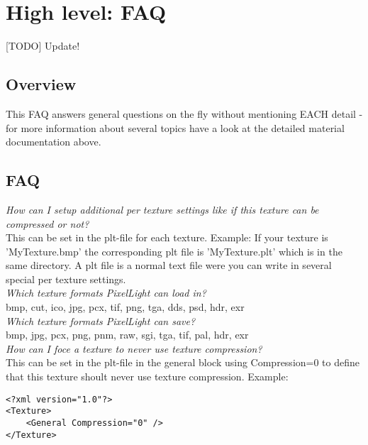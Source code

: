 \chapter{High level: FAQ}


[TODO] Update!



\section{Overview}
This FAQ answers general questions on the fly without mentioning EACH detail - for more information
about several topics have a look at the detailed material documentation above.\\




\section{FAQ}


\emph{How can I setup additional per texture settings like if this texture can be compressed or not?}\\
This can be set in the plt-file for each texture. Example: If your texture is 'MyTexture.bmp' the
corresponding plt file is 'MyTexture.plt' which is in the same directory. A plt file is a normal
text file were you can write in several special per texture settings.\\


\emph{Which texture formats PixelLight can load in?}\\
bmp, cut, ico, jpg, pcx, tif, png, tga, dds, psd, hdr, exr\\


\emph{Which texture formats PixelLight can save?}\\
bmp, jpg, pcx, png, pnm, raw, sgi, tga, tif, pal, hdr, exr\\


\emph{How can I foce a texture to never use texture compression?}\\
This can be set in the plt-file in the general block using Compression=0 to define that this
texture shoult never use texture compression. Example:\\

\begin{lstlisting}[caption=plt-file disable texture compression]
<?xml version="1.0"?>
<Texture>
	<General Compression="0" />
</Texture>
\end{lstlisting}

